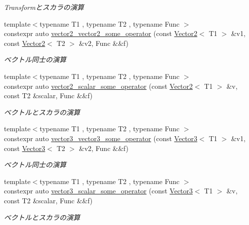 \begin{DoxyCompactItemize}
\begin{DoxyCompactList}\small\item\em Transformとスカラの演算 \end{DoxyCompactList}\item 
{\footnotesize template$<$typename T1 , typename T2 , typename Func $>$ }\\constexpr auto \mbox{\hyperlink{namespacesaki_1_1details_a1e3ab5ffafb707dc8d8b3cf054f3b2e3}{vector2\+\_\+vector2\+\_\+some\+\_\+operator}} (const \mbox{\hyperlink{classsaki_1_1_vector2}{Vector2}}$<$ T1 $>$ \&v1, const \mbox{\hyperlink{classsaki_1_1_vector2}{Vector2}}$<$ T2 $>$ \&v2, Func \&\&f)
\begin{DoxyCompactList}\small\item\em ベクトル同士の演算 \end{DoxyCompactList}\item 
{\footnotesize template$<$typename T1 , typename T2 , typename Func $>$ }\\constexpr auto \mbox{\hyperlink{namespacesaki_1_1details_a8767a64d897787a3b0561939412abb28}{vector2\+\_\+scalar\+\_\+some\+\_\+operator}} (const \mbox{\hyperlink{classsaki_1_1_vector2}{Vector2}}$<$ T1 $>$ \&v, const T2 \&scalar, Func \&\&f)
\begin{DoxyCompactList}\small\item\em ベクトルとスカラの演算 \end{DoxyCompactList}\item 
{\footnotesize template$<$typename T1 , typename T2 , typename Func $>$ }\\constexpr auto \mbox{\hyperlink{namespacesaki_1_1details_a9d9fd5673ab6516752ecf05845e7f9b9}{vector3\+\_\+vector3\+\_\+some\+\_\+operator}} (const \mbox{\hyperlink{classsaki_1_1_vector3}{Vector3}}$<$ T1 $>$ \&v1, const \mbox{\hyperlink{classsaki_1_1_vector3}{Vector3}}$<$ T2 $>$ \&v2, Func \&\&f)
\begin{DoxyCompactList}\small\item\em ベクトル同士の演算 \end{DoxyCompactList}\item 
{\footnotesize template$<$typename T1 , typename T2 , typename Func $>$ }\\constexpr auto \mbox{\hyperlink{namespacesaki_1_1details_a65a656e3fd6cb4f45afc9137f5e6383a}{vector3\+\_\+scalar\+\_\+some\+\_\+operator}} (const \mbox{\hyperlink{classsaki_1_1_vector3}{Vector3}}$<$ T1 $>$ \&v, const T2 \&scalar, Func \&\&f)
\begin{DoxyCompactList}\small\item\em ベクトルとスカラの演算 \end{DoxyCompactList}\item 

\end{DoxyCompactItemize}
